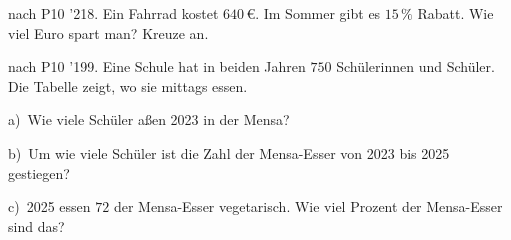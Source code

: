 \documentclass[11pt]{article}
\begin{document}
\begin{pfaufg}{nach P10 ’21}{8.}{}
Ein Fahrrad kostet $640\,€$. Im Sommer gibt es $15\,\%$ Rabatt. Wie viel Euro spart man? Kreuze an.\par\medskip\noindent{}\par
{}
\end{pfaufg}

\begin{pfaufg}{nach P10 ’19}{9.}{}
Eine Schule hat in beiden Jahren $750$ Schülerinnen und Schüler. Die Tabelle zeigt, wo sie mittags essen.\par\medskip{}\par\smallskip
\noindent\begin{minipage}[t]{0.48\linewidth}
a)\ Wie viele Schüler aßen 2023 in der Mensa?
\end{minipage}\hfill
\begin{minipage}[t]{0.48\linewidth}
b)\ Um wie viele Schüler ist die Zahl der Mensa-Esser von 2023 bis 2025 gestiegen?
\end{minipage}
\noindent\begin{minipage}[t]{0.48\linewidth}
c)\ 2025 essen $72$ der Mensa-Esser vegetarisch. Wie viel Prozent der Mensa-Esser sind das?
\end{minipage}
\end{pfaufg}

\par\vfill{}
\end{document}
